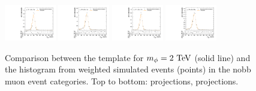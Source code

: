 \begin{figure}[htpb]
  \includegraphics[width=0.2\textwidth]{fig/2Dfit/templateVsReco_RadToWW2000_r0_MJ_mu_HP_nobb_LDy.pdf}
  \includegraphics[width=0.2\textwidth]{fig/2Dfit/templateVsReco_RadToWW2000_r0_MJ_mu_LP_nobb_LDy.pdf}
  \includegraphics[width=0.2\textwidth]{fig/2Dfit/templateVsReco_RadToWW2000_r0_MJ_mu_HP_nobb_HDy.pdf}
  \includegraphics[width=0.2\textwidth]{fig/2Dfit/templateVsReco_RadToWW2000_r0_MJ_mu_LP_nobb_HDy.pdf}\\
  \caption{
    Comparison between the \ggF\RadtoWW template for $m_{\Rad}=2\unit{TeV}$ (solid line) and the histogram from weighted simulated events (points) in the nobb muon event categories.
    Top to bottom: \MVV projections, \MJ projections.
  }
  \label{fig:1dtemplateVsReco_RadToWW2000_Run2}
\end{figure}

